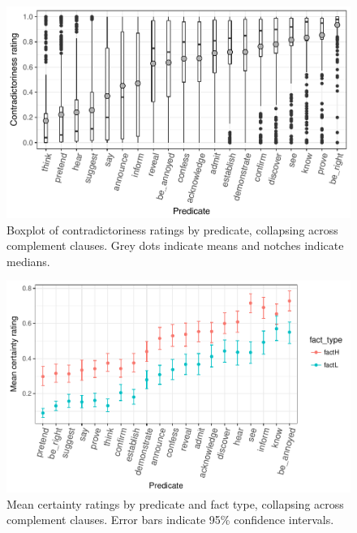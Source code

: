 \documentclass[12pt,fleqn]{article}
\newcommand{\6}{\mbox{$[\hspace*{-.6mm}[$}}
\newcommand{\9}{\mbox{$]\hspace*{-.6mm}]$}}
\begin{document}
\newpage

\begin{figure}[h!]
\centering

\includegraphics[width=.6\paperwidth]{../results/2-veridicality2/graphs/boxplot-veridicality}

\caption{Boxplot of contradictoriness ratings by predicate, collapsing across complement clauses. Grey dots indicate means and notches indicate medians.}
\label{f-veridicality}
\end{figure}

\begin{figure}[h!]
\centering

\includegraphics[width=.6\paperwidth]{../results/3-projectivity/graphs/boxplot-projectivity-by-predicate-and-facttype}

\caption{Mean certainty ratings by predicate and fact type, collapsing across complement clauses. Error bars indicate 95\% confidence intervals.}
\label{f-veridicality}
\end{figure}

\begin{scriptsize}


\end{scriptsize}
\end{document}
